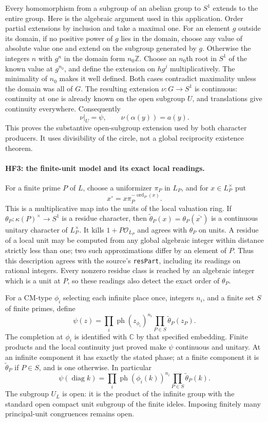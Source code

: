 Every homomorphism from a subgroup of an abelian group to $S^1$
extends to the entire group. Here is the algebraic argument
used in this application. Order partial extensions by inclusion
and take a maximal one. For an element $g$ outside its domain,
if no positive power of $g$ lies in the domain, choose any value
of absolute value one and extend on the subgroup generated by
$g$. Otherwise the integers $n$ with $g^n$ in the domain form
$n_0\mathbb Z$. Choose an $n_0$th root in $S^1$ of the known
value at $g^{n_0}$, and define the extension on $h g^j$
multiplicatively. The minimality of $n_0$ makes it well defined.
Both cases contradict maximality unless the domain was all of
$G$. The resulting extension $\nu:G\to S^1$ is continuous:
continuity at one is already known on the open subgroup $U$,
and translations give continuity everywhere.
Consequently
\[
 \nu|_U=\psi,\qquad \nu(\alpha(y))=a(y).
 \tag{HF.5}
\]
This proves the substantive open-subgroup extension used by
both character producers. It uses divisibility of the circle,
not a global reciprocity existence theorem.

\paragraph{HF3: the finite-unit model and its exact local readings.}
For a finite prime $P$ of $L$, choose a uniformizer $\pi_P$ in
$L_P$, and for $x\in L_P^\times$ put
\[
       x^\circ=x\pi_P^{-\operatorname{ord}_P(x)}.
 \tag{HF.6}
\]
This is a multiplicative map into the units of the local
valuation ring. If $\theta_P:\kappa(P)^\times\to S^1$ is a
residue character, then
$\widetilde\theta_P(x)=\theta_P(\overline{x^\circ})$
is a continuous unitary character of $L_P^\times$.
It kills $1+P\mathcal O_{L_P}$ and agrees with $\theta_P$
on units. A residue of a local unit may be computed from any
global algebraic integer within distance strictly less than
one; two such approximations differ by an element of $P$.
Thus this description agrees with the source's
\texttt{resPart}, including its readings on rational integers.
Every nonzero residue class is reached by an algebraic integer
which is a unit at $P$, so these readings also detect the exact
order of $\theta_P$.

For a CM-type $\phi_i$ selecting each infinite place once,
integers $n_i$, and a finite set $S$ of finite primes, define
\[
 \psi(z)=\prod_i\operatorname{ph}(z_{\phi_i})^{n_i}
                \prod_{P\in S}\widetilde\theta_P(z_P).
 \tag{HF.7}
\]
The completion at $\phi_i$ is identified with $\mathbb C$ by
that specified embedding. Finite products and the local
continuity just proved make $\psi$ continuous and unitary.
At an infinite component it has exactly the stated phase;
at a finite component it is $\widetilde\theta_P$ if $P\in S$,
and is one otherwise. In particular
\[
 \psi(\operatorname{diag}k)
   =\prod_i\operatorname{ph}(\phi_i(k))^{n_i}
      \prod_{P\in S}\widetilde\theta_P(k).
 \tag{HF.8}
\]
The subgroup $U_L$ is open: it is the product of the infinite
group with the standard open compact unit subgroup of the
finite ideles. Imposing finitely many principal-unit
congruences remains open.


